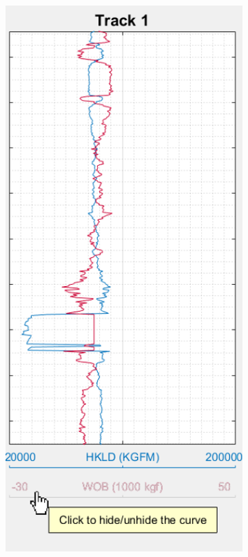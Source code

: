 \documentclass[12pt,a4paper,oneside]{report}
\begin{document}
\begin{figure}[H]
\centering
  \begin{subfigure}[b]{0.31\textwidth}
    \includegraphics[width=\textwidth]{1_hide.png}

\end{subfigure}
\end{figure}
\end{document}
